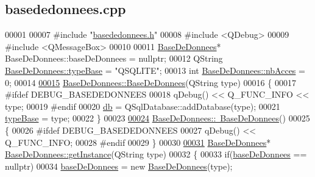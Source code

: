 \hypertarget{basededonnees_8cpp_source}{}\subsection{basededonnees.\+cpp}
\label{basededonnees_8cpp_source}

\begin{DoxyCode}
00001 
00007 \textcolor{preprocessor}{#include "\hyperlink{basededonnees_8h}{basededonnees.h}"}
00008 \textcolor{preprocessor}{#include <QDebug>}
00009 \textcolor{preprocessor}{#include <QMessageBox>}
00010 
00011 \hyperlink{class_base_de_donnees}{BaseDeDonnees}* BaseDeDonnees::baseDeDonnees = \textcolor{keyword}{nullptr};
00012 QString \hyperlink{class_base_de_donnees_ab682b82167f494496a6531bfe522b42b}{BaseDeDonnees::typeBase} = \textcolor{stringliteral}{"QSQLITE"};
00013 \textcolor{keywordtype}{int} \hyperlink{class_base_de_donnees_a5099ecb2922bb31d84cd5d4505298a29}{BaseDeDonnees::nbAcces} = 0;
00014 
\hyperlink{class_base_de_donnees_a10dd177f1008f675ab78c2221b2a6750}{00015} \hyperlink{class_base_de_donnees_a10dd177f1008f675ab78c2221b2a6750}{BaseDeDonnees::BaseDeDonnees}(QString type)
00016 \{
00017 \textcolor{preprocessor}{    #ifdef DEBUG\_BASEDEDONNEES}
00018     qDebug() << Q\_FUNC\_INFO << type;
00019 \textcolor{preprocessor}{    #endif}
00020     \hyperlink{class_base_de_donnees_a3e738dcf443370c46a541677ab619f06}{db} = QSqlDatabase::addDatabase(type);
00021     \hyperlink{class_base_de_donnees_ab682b82167f494496a6531bfe522b42b}{typeBase} = type;
00022 \}
00023 
\hyperlink{class_base_de_donnees_a5dc474cdbe003644fb0ca7b8f2ec6b93}{00024} \hyperlink{class_base_de_donnees_a5dc474cdbe003644fb0ca7b8f2ec6b93}{BaseDeDonnees::~BaseDeDonnees}()
00025 \{
00026 \textcolor{preprocessor}{    #ifdef DEBUG\_BASEDEDONNEES}
00027     qDebug() << Q\_FUNC\_INFO;
00028 \textcolor{preprocessor}{    #endif}
00029 \}
00030 
\hyperlink{class_base_de_donnees_a58beb2f702f75b257e2e55e25d9f979b}{00031} \hyperlink{class_base_de_donnees}{BaseDeDonnees}* \hyperlink{class_base_de_donnees_a58beb2f702f75b257e2e55e25d9f979b}{BaseDeDonnees::getInstance}(QString type)
00032 \{
00033     \textcolor{keywordflow}{if}(\hyperlink{class_base_de_donnees_a822ba0b7cf85b1e48ced8efd3d65e266}{baseDeDonnees} == \textcolor{keyword}{nullptr})
00034         \hyperlink{class_base_de_donnees_a822ba0b7cf85b1e48ced8efd3d65e266}{baseDeDonnees} = \textcolor{keyword}{new} \hyperlink{class_base_de_donnees_a10dd177f1008f675ab78c2221b2a6750}{BaseDeDonnees}(type);

\end{DoxyCode}

